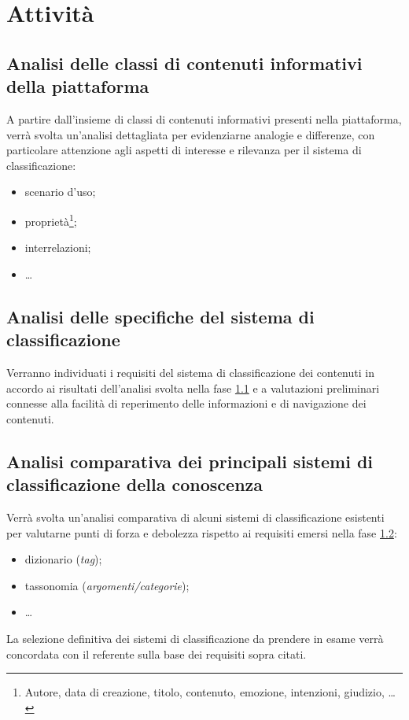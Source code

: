 \documentclass[10pt,a4paper,hidelinks]{scrartcl} %
\begin{document}
	\newpage
	\section{Attivit\`a}
	
	\subsection{Analisi delle classi di contenuti informativi della piattaforma}
	\label{sec:stage:wp:analisi-contenuti}
	A partire dall'insieme di classi di contenuti informativi presenti nella piattaforma, verrà svolta un'analisi dettagliata per evidenziarne analogie e differenze, con particolare attenzione agli aspetti di interesse e rilevanza per il sistema di classificazione:
	\begin{itemize}
		\item scenario d'uso;
		\item proprietà\footnote{Autore, data di creazione, titolo, contenuto, emozione, intenzioni, giudizio, \ldots};
		\item interrelazioni;
		\item \ldots
	\end{itemize}

	\subsection{Analisi delle specifiche del sistema di classificazione}
	\label{sec:stage:wp:ar}
	Verranno individuati i requisiti del sistema di classificazione dei contenuti in accordo ai risultati dell'analisi svolta nella fase \ref{sec:stage:wp:analisi-contenuti} e a valutazioni preliminari connesse alla facilità di reperimento delle informazioni e di navigazione dei contenuti.

	\subsection{Analisi comparativa dei principali sistemi di classificazione della conoscenza}
	\label{sec:stage:wp:ac}
	Verrà svolta un'analisi comparativa di alcuni sistemi di classificazione esistenti per valutarne punti di forza e debolezza rispetto ai requisiti emersi nella fase \ref{sec:stage:wp:ar}:
	\begin{itemize}
		\item dizionario (\emph{tag});
		\item tassonomia (\emph{argomenti/categorie});
		\item \ldots
	\end{itemize}
	La selezione definitiva dei sistemi di classificazione da prendere in esame verrà concordata con il referente sulla base dei requisiti sopra citati.
\end{document}
